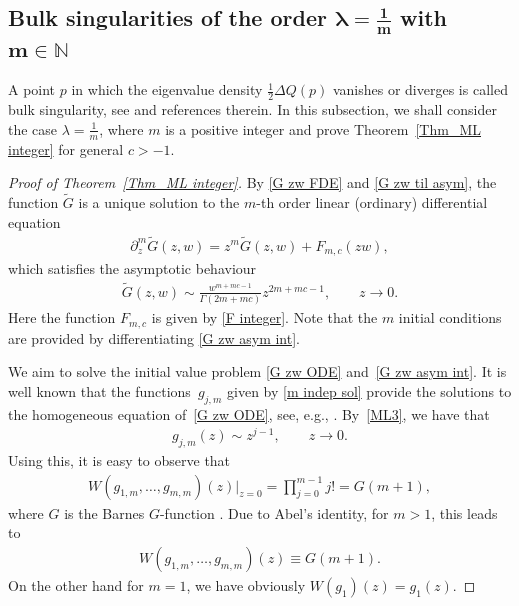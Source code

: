 \documentclass[11pt]{article}
\numberwithin{equation}{section}
\numberwithin{equation}{section}
\newcommand{\1}{\chi}
\begin{document}
\subsection[Bulk singularities of the order lambda=1/m with m in N]{Bulk singularities of the order $\boldsymbol{\lambda=\frac1m}$ with $\boldsymbol{m\in \mathbb{N}}$}

A point $p$ in which the eigenvalue density $\frac12\Delta Q(p)$ vanishes or diverges is called bulk singularity, see \cite{ameur2018random} and references therein. In this subsection, we shall consider the case $\lambda=\frac1m$, where $m$ is a positive integer and prove Theorem~\ref{Thm_ML integer} for general $c>-1$.

\begin{proof}[Proof of Theorem~\ref{Thm_ML integer}]
	By \eqref{G zw FDE} and \eqref{G zw til asym}, the function $\widetilde{G}$ is a unique solution to the $m$-th order linear (ordinary) differential equation
	\begin{gather} \label{G zw ODE}
		\partial_z ^m \widetilde{G}(z,w)=z^m \widetilde{G}(z,w)+F_{m,c}(zw),
	\end{gather}
	which satisfies the asymptotic behaviour
	\begin{gather} \label{G zw asym int}
		\widetilde{G}(z,w) \sim \frac{w^{m+mc-1}}{ \Gamma(2m+mc) } z^{2m+mc-1},\qquad z \to 0.
	\end{gather}
	Here the function $F_{m,c}$ is given by \eqref{F integer}. Note that the $m$ initial conditions are provided by differentiating \eqref{G zw asym int}.
	
We aim to solve the initial value problem \eqref{G zw ODE} and~\eqref{G zw asym int}.
	It is well known that the functions~$g_{j,m}$ given by \eqref{m indep sol} provide the solutions to the homogeneous equation of~\eqref{G zw ODE}, see, e.g., \cite[Theorem~5.18]{gorenflo2014mittag}.
	By~\eqref{ML3}, we have that
	\begin{gather} \label{gj asymp}
		g_{j,m}(z) \sim z^{j-1} ,\qquad z \to 0.
	\end{gather}
	Using this, it is easy to observe that
	\begin{gather*}
		W(g_{1,m},\dots,g_{m,m})(z)|_{z=0}=\prod_{j=0}^{m-1} j!=G(m+1),
	\end{gather*}
	where $G$ is the Barnes $G$-function \cite[Section~5.17]{olver2010nist}. Due to Abel's identity, for $m>1$, this leads to
	\begin{gather} \label{Wronskian g1m}
		W(g_{1,m},\dots,g_{m,m})(z) \equiv G(m+1).
	\end{gather}
	On the other hand for $m=1$, we have obviously $W(g_1)(z)=g_1(z).$
	

\end{proof}
\end{document}
